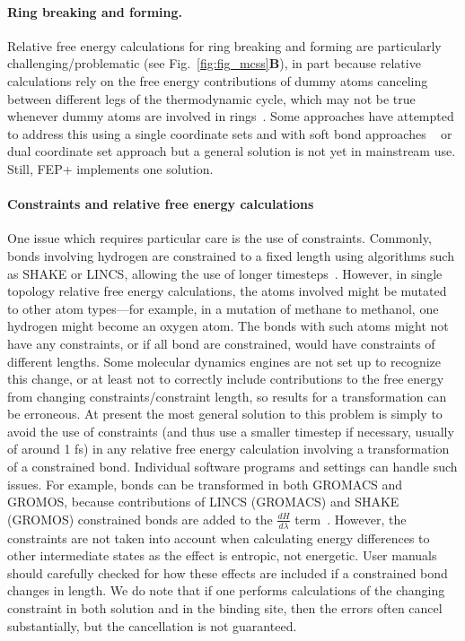 \documentclass[9pt,bestpractices,pubversion]{livecoms}
\begin{document}
\paragraph{Ring breaking and forming.} Relative free energy calculations for ring breaking and forming are particularly challenging/problematic (see Fig.~\ref{fig:fig_mcss}\textbf{B}), in part because relative calculations rely on the free energy contributions of dummy atoms canceling between different legs of the thermodynamic cycle, which may not be true whenever dummy atoms are involved in rings~\cite{liu2015ring}.
Some approaches have attempted to address this using a single coordinate sets and with soft bond approaches ~\cite{clark2019relative,wang2017accurate} or dual coordinate set approach \cite{jespers2019qligfep, ries2022relative} but a general solution is not yet in mainstream use. Still, FEP+ implements one solution\cite{wang2017accurate}.

\paragraph{Constraints and relative free energy calculations}
One issue which requires particular care is the use of constraints.
Commonly, bonds involving hydrogen are constrained to a fixed length using algorithms such as SHAKE or LINCS, allowing the use of longer timesteps~\cite{krautler2001fast}.
However, in single topology relative free energy calculations, the atoms involved might be mutated to other atom types---for example, in a mutation of methane to methanol, one hydrogen might become an oxygen atom. The bonds with such atoms might not have any constraints, or if all bond are constrained, would have constraints of different lengths. 
Some molecular dynamics engines are not set up to recognize this change, or at least not to correctly include contributions to the free energy from changing constraints/constraint length, so results for a transformation can be erroneous.
At present the most general solution to this problem is simply to avoid the use of constraints (and thus use a smaller timestep if necessary, usually of around 1 fs) in any relative free energy calculation involving a transformation of a constrained bond. Individual software programs and settings can handle such issues. For example, bonds can be transformed in both GROMACS and GROMOS, because contributions of LINCS (GROMACS) and SHAKE (GROMOS) constrained bonds are added to the $\frac{dH}{d\lambda}$ term~\cite{pearlman1993determining, straatsma1992holonomic, pearlman1991overlooked, gunsteren1989computer}. However, the constraints are not taken into account when calculating energy differences to other intermediate states as the effect is entropic, not energetic. User manuals should carefully checked for how these effects are included if a constrained bond changes in length. We do note that if one performs calculations of the changing constraint in both solution and in the binding site, then the errors often cancel substantially, but the cancellation is not guaranteed.
\end{document}
